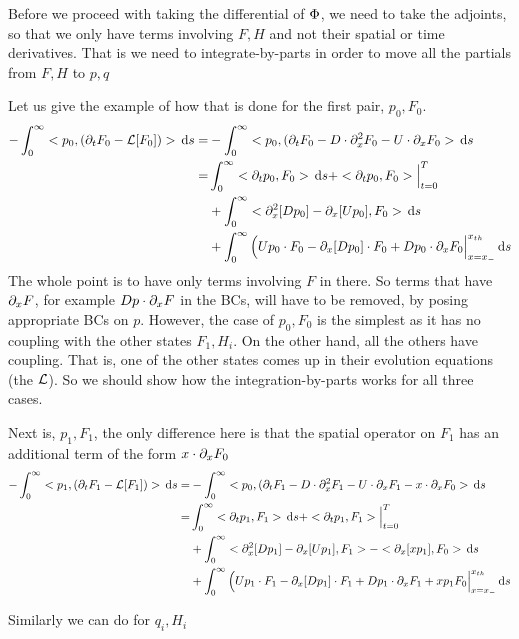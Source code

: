 \documentclass{article}
\begin{document}
Before we proceed with taking the differential of ${\Phi}$, we need to take the
adjoints, so that we only have terms involving $F,H$ and not their spatial or
time derivatives. That is we need to integrate-by-parts in order to move all the
partials from $F,H$ to $p,q$

Let us give the example of how that is done for the first pair, $p_0, F_0$.
\begin{align*}
-\int_0^\infty <p_0, ({\partial}_t F_0 - { \mathcal{L} }[F_0])> \, \mathrm{d} s
 =&-\int_0^\infty <p_0 , ({\partial}_t F_0 - D \cdot {\partial}_x^2F_0 - U \cdot {\partial}_x
 F_0>
 \, \mathrm{d} s
\\
=&
 	\int_0^\infty <{\partial}_t p_0 , F_0> \, \mathrm{d} s + <{\partial}_t p_0 , F_0>  \Big|^{T}_{t=0}
	  \\
	  &+ \int_0^\infty 
	  <{\partial}^2_x [D p_0] - {\partial}_x [Up_0], F_0>
	  \, \mathrm{d} s
	  \\
	  &+ \int_0^\infty 
	   \Big( Up_0 \cdot F_0 - {\partial}_x[Dp_0]\cdot F_0 + Dp_0\cdot {\partial}_xF_0
	   \Big|_{x={ x_{-} }}^{{ x_{th} }}
	  \, \mathrm{d} s
\end{align*}
The whole point is to have only terms involving $F$ in there. So terms that have
${\partial}_xF$, for example $Dp\cdot {\partial}_x F$ in the BCs, will have to be removed, by
posing appropriate BCs on $p$. However, the case of $p_0, F_0$ is the simplest
as it has no coupling with the other states $F_1, H_i$. On the other hand, all
the others have coupling. That is, one of the other states comes up in their
evolution equations (the ${ \mathcal{L} }$). So we should show how the integration-by-parts
works for all three cases. 

Next is, $p_1, F_1$, the only difference here is that the spatial operator on
$F_1$ has an additional term of the form $x \cdot {\partial}_x F_0$
\begin{align*}
-\int_0^\infty <p_1, ({\partial}_t F_1 - { \mathcal{L} }[F_1])> \, \mathrm{d} s
 =&-\int_0^\infty <p_0 ,
 			 ({\partial}_t F_1 - D \cdot {\partial}^2_x F_1 -
 			  U  \cdot {\partial}_x F_1 -
 			  x \cdot {\partial}_x F_0>
 \, \mathrm{d} s
\\
=&
\int_0^\infty <{\partial}_t p_1 , F_1> \, \mathrm{d} s + <{\partial}_t p_1 , F_1>  \Big|^{T}_{t=0}
  \\
  &+ \int_0^\infty 
  <{\partial}^2_x [D p_1] - {\partial}_x [Up_1], F_1>
  - < {\partial}_x [x p_1], F_0 >
  \, \mathrm{d} s
  \\
  &+ \int_0^\infty
  \Big( Up_1 \cdot F_1 - {\partial}_x[Dp_1]\cdot F_1 + Dp_1\cdot {\partial}_xF_1
  		+ x p_1 F_0
	   \Big|_{x={ x_{-} }}^{{ x_{th} }} 
  \, \mathrm{d} s
\end{align*}

Similarly we can do for $q_i, H_i$
\end{document}

